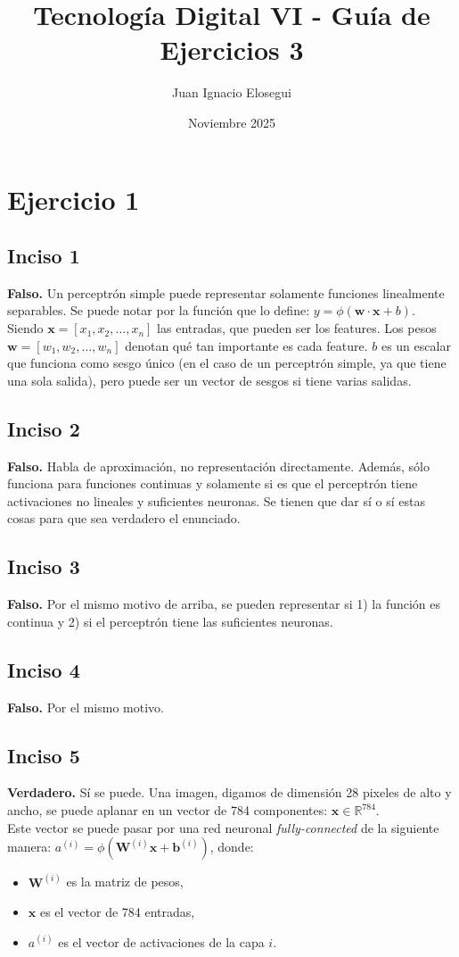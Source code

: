 \documentclass{article}
\title{Tecnología Digital VI - Guía de Ejercicios 3}
\author{Juan Ignacio Elosegui}
\date{Noviembre 2025}
\begin{document}
    \maketitle
    \section*{Ejercicio 1}
        \subsection*{Inciso 1}
            \textbf{Falso.} Un perceptrón simple puede representar solamente funciones linealmente separables. Se puede notar por la función que lo define: \(y = \phi(\mathbf{w} \cdot \mathbf{x} + b)\). \\
            Siendo \(\mathbf{x} = [x_{1}, x_{2}, \ldots, x_{n}]\) las entradas, que pueden ser los features. Los pesos \(\mathbf{w} = [w_{1}, w_{2}, \ldots, w_{n}]\) denotan qué tan importante es cada feature. \(b\) es un escalar que funciona como sesgo único (en el caso de un perceptrón simple, ya que tiene una sola salida), pero puede ser un vector de sesgos si tiene varias salidas.
        \subsection*{Inciso 2}
           \textbf{Falso.} Habla de aproximación, no representación directamente. Además, sólo funciona para funciones continuas y solamente si es que el perceptrón tiene activaciones no lineales y suficientes neuronas. Se tienen que dar sí o sí estas cosas para que sea verdadero el enunciado.
        \subsection*{Inciso 3}
            \textbf{Falso.} Por el mismo motivo de arriba, se pueden representar si 1) la función es continua y 2) si el perceptrón tiene las suficientes neuronas.
        \subsection*{Inciso 4}
            \textbf{Falso.} Por el mismo motivo.
        \subsection*{Inciso 5}
            \textbf{Verdadero.} Sí se puede. Una imagen, digamos de dimensión 28 pixeles de alto y ancho, se puede aplanar en un vector de 784 componentes: \(\mathbf{x} \in \mathbb{R}^{784}\). \\
            Este vector se puede pasar por una red neuronal \textit{fully-connected} de la siguiente manera: \(a^{(i)} = \phi\left(\mathbf{W}^{(i)}\mathbf{x} + \mathbf{b}^{(i)}\right)\), donde:
            \begin{itemize}
                \item \(\mathbf{W}^{(i)}\) es la matriz de pesos,
                \item \(\mathbf{x}\) es el vector de 784 entradas,
                \item \(a^{(i)}\) es el vector de activaciones de la capa $i$.
            \end{itemize}
\end{document}
